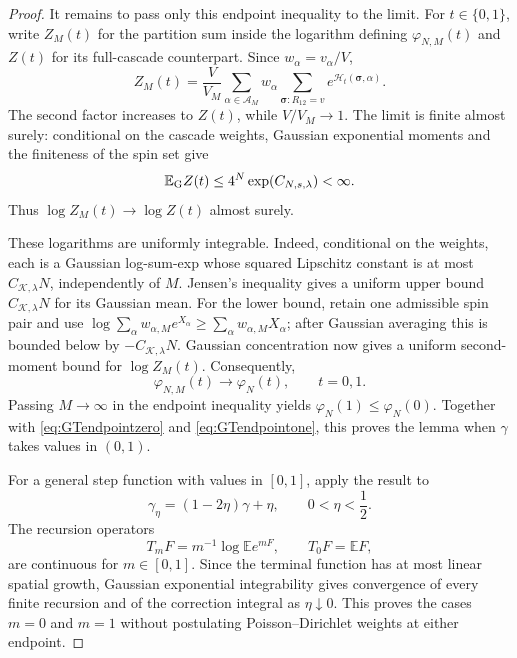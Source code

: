\documentclass[11pt]{article}
\numberwithin{equation}{section}
\theoremstyle{plain}
\theoremstyle{definition}
\newcommand{\E}{\mathbb E}
\newcommand{\1}{\mathbf 1}
\newcommand{\cK}{\mathcal K}
\begin{document}
\begin{proof}
It remains to pass only this endpoint inequality to the limit.  For
$t\in\{0,1\}$, write $Z_M(t)$ for the partition sum inside the
logarithm defining $\varphi_{N,M}(t)$ and $Z(t)$ for its full-cascade
counterpart.  Since $w_\alpha=v_\alpha/V$,
\[
 Z_M(t)=\frac{V}{V_M}
 \sum_{\alpha\in\mathcal A_M}w_\alpha
 \sum_{\boldsymbol\sigma:R_{12}=v}
 e^{\mathcal H_t(\boldsymbol\sigma,\alpha)}.
\]
The second factor increases to $Z(t)$, while $V/V_M\to1$.  The limit
is finite almost surely: conditional on the cascade weights, Gaussian
exponential moments and the finiteness of the spin set give
\[
 \E_{\rm G} Z(t)\le 4^N\exp(C_{N,s,\lambda})<\infty.
\]
Thus $\log Z_M(t)\to\log Z(t)$ almost surely.

These logarithms are uniformly integrable.  Indeed, conditional on
the weights, each is a Gaussian log-sum-exp whose squared Lipschitz
constant is at most $C_{\cK,\lambda}N$, independently of $M$.
Jensen's inequality gives a uniform upper bound $C_{\cK,\lambda}N$
for its Gaussian mean.  For the lower bound, retain one admissible
spin pair and use
$\log\sum_\alpha w_{\alpha,M}e^{X_\alpha}
 \ge\sum_\alpha w_{\alpha,M}X_\alpha$; after Gaussian averaging this
is bounded below by $-C_{\cK,\lambda}N$.  Gaussian concentration now
gives a uniform second-moment bound for $\log Z_M(t)$.  Consequently,
\begin{equation}
 \varphi_{N,M}(t)\longrightarrow\varphi_N(t),
 \qquad t=0,1.
 \label{eq:cascadeendpointlimit}
\end{equation}
Passing $M\to\infty$ in the endpoint inequality yields
$\varphi_N(1)\le\varphi_N(0)$.  Together with
\eqref{eq:GTendpointzero} and \eqref{eq:GTendpointone}, this proves the
lemma when $\gamma$ takes values in $(0,1)$.

For a general step function with values in $[0,1]$, apply the result
to
\[
 \gamma_\eta=(1-2\eta)\gamma+\eta,\qquad
 0<\eta<\frac12.
\]
The recursion operators
\[
 T_mF=m^{-1}\log\E e^{mF},\qquad T_0F=\E F,
\]
are continuous for $m\in[0,1]$.  Since the terminal function has at
most linear spatial growth, Gaussian exponential integrability gives
convergence of every finite recursion and of the correction integral
as $\eta\downarrow0$.  This proves the cases $m=0$ and $m=1$ without
postulating Poisson--Dirichlet weights at either endpoint.
\end{proof}
\end{document}
